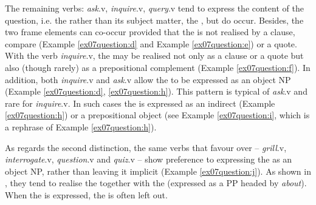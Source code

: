 \documentclass[output=paper,colorlinks,citecolor=brown]{langscibook}
\begin{document}
The remaining verbs: \textit{ask}.v, \textit{inquire}.v, \textit{query}.v tend to express the content of the question, i.e. the  rather than its subject matter, the , but  do occur. Besides, the two frame elements can co-occur provided that the  is not realised by a clause, compare (Example \ref{ex07question:d} and Example \ref{ex07question:e}) or a quote. With the verb \textit{inquire}.v, the  may be realised not only as a clause or a quote but also (though rarely) as a prepositional complement (Example \ref{ex07question:f}). In addition, both \textit{inquire}.v and \textit{ask}.v allow the  to be expressed as an object NP (Example \ref{ex07question:d}, \ref{ex07question:h}). This pattern is typical of \textit{ask}.v and rare for \textit{inquire}.v. In such cases the  is expressed as an indirect (Example \ref{ex07question:h}) or a prepositional object (see Example \ref{ex07question:i}, which is a rephrase of Example \ref{ex07question:h}).

As regards the second distinction, the same verbs that favour  over  -- \textit{grill}.v, \textit{interrogate}.v, \textit{question}.v and \textit{quiz}.v -- show preference to expressing the  as an object NP, rather than leaving it implicit (Example \ref{ex07question:j}). As shown in , they tend to realise the  together with the  (expressed as a PP headed by \textit{about}). When the  is expressed, the  is often left out.

\end{document}
